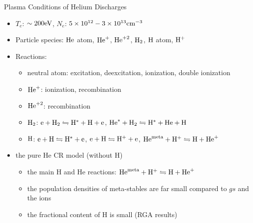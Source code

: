 \begin{frame}{Plasma Conditions of Helium Discharges}
	\begin{itemize}
		\item $T_e$: $\sim 200\rm{eV}$, $N_e$: $5\times 10^{12}-3\times 10^{13}\rm{cm}^{-3}$
		\item Particle species: $\rm{He}$ atom, $\rm{He}^+$, $\rm{He}^{+2}$, $\rm{H}_2$, $\rm{H}$ atom, $\rm{H}^+$
		\item Reactions:
			\begin{itemize}
				\item neutral atom: excitation, deexcitation, ionization, double ionization
				\item $\rm{He}^+$: ionization, recombination
				\item $\rm{He}^{+2}$: recombination
				\item $\rm{H}_2$: $\rm{e}+\rm{H}_2\leftrightharpoons\rm{H}^*+\rm{H}+\rm{e}$,
					$\rm{He}^*+\rm{H}_2\leftrightharpoons\rm{H}^*+\rm{He}+\rm{H}$
				\item $\rm{H}$: $\rm{e}+\rm{H}\leftrightharpoons\rm{H}^*+\rm{e}$,
					$\rm{e}+\rm{H}\leftrightharpoons\rm{H}^++\rm{e}$,
					$\rm{He}^{\rm meta}+\rm{H}^+\leftrightharpoons\rm{H}+\rm{He}^+$
			\end{itemize}
        \item the pure He CR model (without H)
            \begin{itemize}
              \item the main H and He reactions: $\rm{He}^{\rm meta}+\rm{H}^+\leftrightharpoons\rm{H}+\rm{He}^+$
              \item the population densities of meta-stables are far small compared to $gs$ and the ions
              \item the fractional content of H is small (RGA results)
            \end{itemize}
	\end{itemize}
\end{frame}

